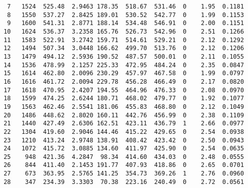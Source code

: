 \documentclass[10pt]{article}
\begin{document}
\begin{small}
\begin{verbatim}
  7   1524  525.48  2.9463 178.35  518.67  531.46  0    1.95  0.1181
  8   1550  537.27  2.8425 189.01  530.52  542.77  0    1.99  0.1153
  9   1600  541.31  2.8771 188.14  534.48  546.91  0    2.00  0.1151
 10   1624  536.37  3.2358 165.76  526.73  542.96  0    2.51  0.1266
 11   1583  522.91  3.2742 159.71  514.61  529.21  0    2.12  0.1292
 12   1494  507.34  3.0448 166.62  499.70  513.76  0    2.12  0.1206
 13   1479  494.12  2.5936 190.52  487.57  500.01  0    2.11  0.1055
 14   1536  478.99  2.1257 225.33  472.95  484.24  0    2.35  0.0847
 15   1614  462.80  2.0096 230.29  457.97  467.58  0    1.99  0.0797
 16   1616  461.72  2.0094 229.78  456.28  466.49  0    2.17  0.0820
 17   1618  470.95  2.4207 194.55  464.96  476.33  0    2.08  0.0970
 18   1599  474.25  2.6244 180.71  468.02  479.77  0    1.92  0.1077
 19   1563  462.46  2.5541 181.06  455.83  468.80  0    2.12  0.1049
 20   1486  448.62  2.8020 160.11  442.76  456.99  0    2.38  0.1109
 21   1440  427.49  2.6306 162.51  423.11  436.79  1    2.66  0.0977
 22   1304  419.60  2.9046 144.46  415.22  429.65  0    2.54  0.0938
 23   1210  413.24  2.9748 138.91  408.42  423.42  0    2.50  0.0943
 24   1072  415.72  3.0885 134.60  411.97  425.90  0    2.54  0.0635
 25    948  421.36  4.2847  98.34  414.60  434.03  0    2.48  0.0555
 26    844  411.40  2.1453 191.77  407.93  418.86  0    2.65  0.0701
 27    673  363.95  2.5765 141.25  354.73  369.26  1    2.76  0.0960
 28    347  234.39  3.3303  70.38  223.16  240.49  0    2.72  0.0561

\end{verbatim}
\end{small}
\end{document}
